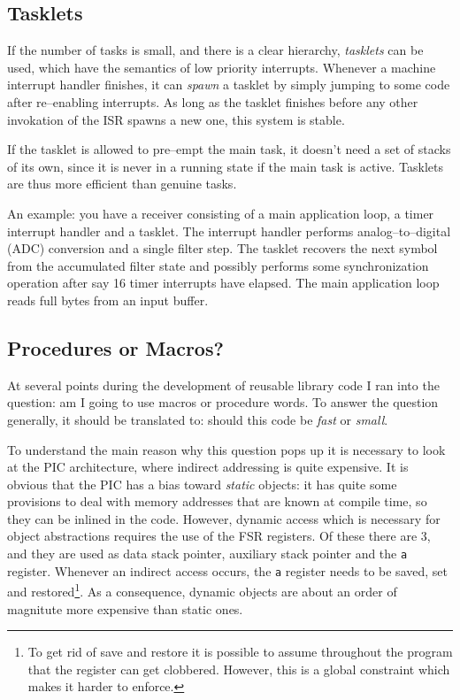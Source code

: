 \documentclass[12pt]{article}
\begin{document}
\subsection{Tasklets}

If the number of tasks is small, and there is a clear hierarchy,
\emph{tasklets} can be used, which have the semantics of low priority
interrupts. Whenever a machine interrupt handler finishes, it can
\emph{spawn} a tasklet by simply jumping to some code after
re--enabling interrupts. As long as the tasklet finishes before any
other invokation of the ISR spawns a new one, this system is
stable. 

If the tasklet is allowed to pre--empt the main task, it doesn't need
a set of stacks of its own, since it is never in a running state if
the main task is active. Tasklets are thus more efficient than genuine
tasks.

An example: you have a receiver consisting of a main application loop,
a timer interrupt handler and a tasklet. The interrupt handler
performs analog--to--digital (ADC) conversion and a single filter
step. The tasklet recovers the next symbol from the accumulated filter
state and possibly performs some synchronization operation after say
16 timer interrupts have elapsed. The main application loop reads full
bytes from an input buffer.


\subsection{Procedures or Macros?}

At several points during the development of reusable library code I
ran into the question: am I going to use macros or procedure words. To
answer the question generally, it should be translated to: should this
code be \emph{fast} or \emph{small}.

To understand the main reason why this question pops up it is
necessary to look at the PIC architecture, where indirect addressing
is quite expensive. It is obvious that the PIC has a bias toward
\emph{static} objects: it has quite some provisions to deal with
memory addresses that are known at compile time, so they can be
inlined in the code. However, dynamic access which is necessary for
object abstractions requires the use of the FSR registers. Of these
there are 3, and they are used as data stack pointer, auxiliary stack
pointer and the \verb|a| register. Whenever an indirect access occurs,
the \verb|a| register needs to be saved, set and restored\footnote{To
  get rid of save and restore it is possible to assume throughout the
  program that the register can get clobbered. However, this is a
  global constraint which makes it harder to enforce.}. As a
consequence, dynamic objects are about an order of magnitute more
expensive than static ones.
\end{document}
